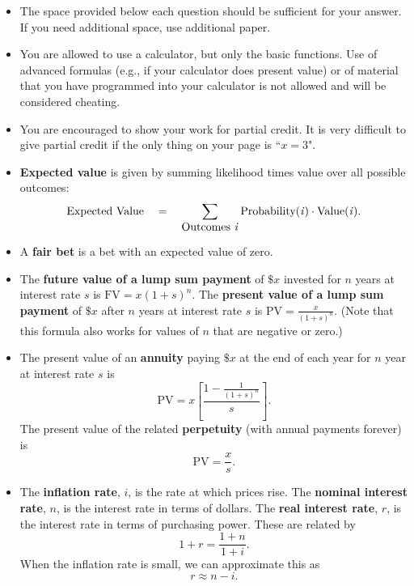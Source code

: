 \documentclass{article}
\begin{document}
\begin{EXAM}

\begin{itemize}

\item The space provided below each question should be sufficient
for your answer. If you need additional space, use additional
paper.

\item You are allowed to use a calculator, but only the basic
functions. Use of advanced formulas (e.g., if your calculator does
present value) or of material that you have programmed into your
calculator is not allowed and will be considered cheating.

\item You are encouraged to show your work for partial credit. It
is very difficult to give partial credit if the only thing on your
page is ``$x=3$".

\item \textbf{Expected value} is given by summing likelihood times value over all possible outcomes:
\[
\mbox{Expected Value}\ \ \  = \ \ \ \sum_{\mbox{Outcomes \emph{i}}} \mbox{Probability(\emph{i})} \cdot \mbox{Value(\emph{i})}.
\]


\item A \textbf{fair bet} is a bet with an expected value of zero.

\item The \textbf{future value of a lump sum payment} of $\$x$ invested for $n$ years at interest rate $s$ is $\displaystyle \mbox{FV} = x(1+s)^{n}$. The \textbf{present value of a lump sum payment} of $\$x$ after $n$ years at interest rate $s$ is $\displaystyle \mbox{PV} = \frac{x}{(1+s)^{n}}.$ (Note that this formula also works for values of $n$ that are negative or zero.)

\item The present value of an \textbf{annuity} paying $\$x$ at the end of each year for $n$ year at interest rate $s$ is
\[
\mbox{PV}=x\left[ \frac{1 - \displaystyle\frac{1}{(1+s)^n}}{s}\right].
\]
The present value of the related \textbf{perpetuity} (with annual payments forever) is
\[
\mbox{PV}=\frac{x}{s}.
\]

\item The \textbf{inflation rate}, $i$, is the rate at which prices rise. The \textbf{nominal interest rate}, $n$, is the interest rate in terms of dollars. The \textbf{real interest rate}, $r$, is the interest rate in terms of purchasing power. These are related by
\[
1+r=\frac{1+n}{1+i}.
\]
When the inflation rate is small, we can approximate this as
\[
r \approx n-i.
\]



\end{itemize}
\end{EXAM}
\end{document}
